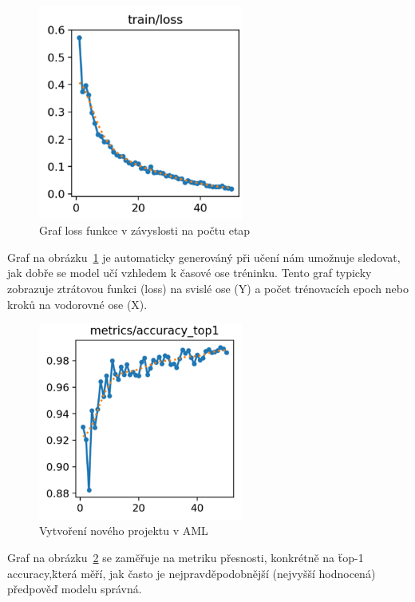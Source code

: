 \begin{figure}[htbp]
    \centering
    \includegraphics[width=0.6\textwidth]{img/loss_funkce}
    \caption{Graf loss funkce v závyslosti na počtu etap}
    \label{fig:loss_funkce}
\end{figure}

Graf na obrázku~\ref{fig:loss_funkce} je automaticky generováný při učení nám umožnuje sledovat, jak dobře se model učí vzhledem k časové ose tréninku.
Tento graf typicky zobrazuje ztrátovou funkci (loss) na svislé ose (Y) a počet trénovacích epoch nebo kroků na vodorovné ose (X).

\begin{figure}[htbp]
    \centering
    \includegraphics[width=0.6\textwidth]{img/top1_accuracy}
    \caption{Vytvoření nového projektu v AML}
    \label{fig:top1_accuracy}
\end{figure}

Graf na obrázku~\ref{fig:top1_accuracy} se zaměřuje na metriku přesnosti, konkrétně na \"top-1 accuracy,\" která měří, jak často je nejpravděpodobnější (nejvyšší hodnocená) předpověď modelu správná.

